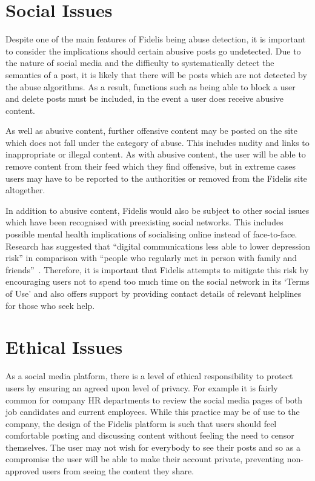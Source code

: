 \section{Social Issues}
Despite one of the main features of Fidelis being abuse detection, it is important to consider the implications should certain abusive posts go undetected. Due to the nature of social media and the difficulty to systematically detect the semantics of a post, it is likely that there will be posts which are not detected by the abuse algorithms. As a result, functions such as being able to block a user and delete posts must be included, in the event a user does receive abusive content.

As well as abusive content, further offensive content may be posted on the site which does not fall under the category of abuse. This includes nudity and links to inappropriate or illegal content. As with abusive content, the user will be able to remove content from their feed which they find offensive, but in extreme cases users may have to be reported to the authorities or removed from the Fidelis site altogether.

In addition to abusive content, Fidelis would also be subject to other social issues which have been recognised with preexisting social networks. This includes possible mental health implications of socialising online instead of face-to-face. Research has suggested that ``digital communications less able to lower depression risk'' in comparison with ``people who regularly met in person with family and friends''~\cite{OHSU:Depression}. Therefore, it is important that Fidelis attempts to mitigate this risk by encouraging users not to spend too much time on the social network in its `Terms of Use' and also offers support by providing contact details of relevant helplines for those who seek help.

\section{Ethical Issues}
As a social media platform, there is a level of ethical responsibility to protect users by ensuring an agreed upon level of privacy. For example it is fairly common for company HR departments to review the social media pages of both job candidates and current employees. While this practice may be of use to the company, the design of the Fidelis platform is such that users should feel comfortable posting and discussing content without feeling the need to censor themselves. The user may not wish for everybody to see their posts and so as a compromise the user will be able to make their account private, preventing non-approved users from seeing the content they share.

